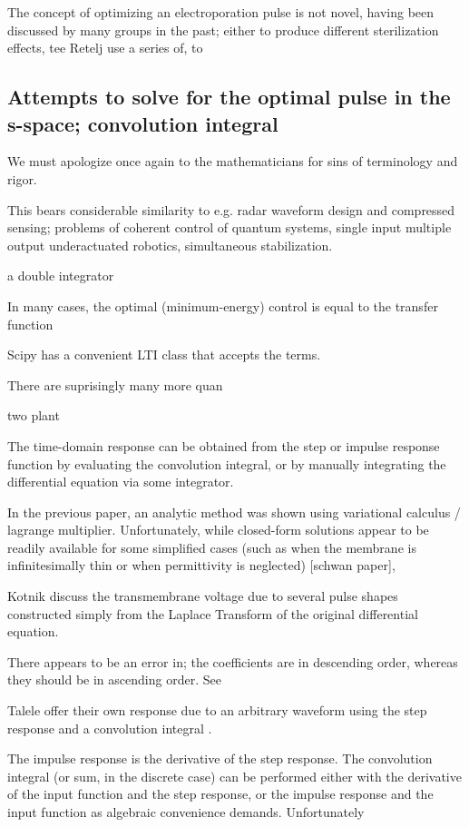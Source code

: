 \documentclass[fleqn,10pt]{paper}
\begin{document}
The concept of optimizing an electroporation pulse is not novel, having been discussed by many groups in the past; either to produce different sterilization effects, tee Retelj use a series of, to 

\subsection{Attempts to solve for the optimal pulse in the s-space; convolution integral}

We must apologize once again to the mathematicians for sins of terminology and rigor.

This bears considerable similarity to e.g. radar waveform design and compressed sensing; problems of coherent control of quantum systems, single input multiple output underactuated robotics, simultaneous stabilization\cite{results1984}\cite{Simultaneous2005}.

a double integrator 

In many cases, the optimal (minimum-energy) control is equal to the transfer function

Scipy has a convenient LTI class that accepts the terms.



There are suprisingly many more quan

two plant

The time-domain response can be obtained from the step or impulse response function by evaluating the convolution integral, or by manually integrating the differential equation via some integrator.

In the previous paper, an analytic method was shown using variational calculus / lagrange multiplier. Unfortunately, while closed-form solutions appear to be readily available for some simplified cases (such as when the membrane is infinitesimally thin or when permittivity is neglected) [schwan paper], 

Kotnik discuss the transmembrane voltage due to several pulse shapes constructed simply from the Laplace Transform of the original differential equation. 

There appears to be an error in; the coefficients are in descending order, whereas they should be in ascending order. See 

Talele offer their own response due to an arbitrary waveform using the step response and a convolution integral \cite{Nonlinear2007}.

The impulse response is the derivative of the step response. The convolution integral (or sum, in the discrete case) can be performed either with the derivative of the input function and the step response, or the impulse response and the input function as algebraic convenience demands. Unfortunately
\end{document}
